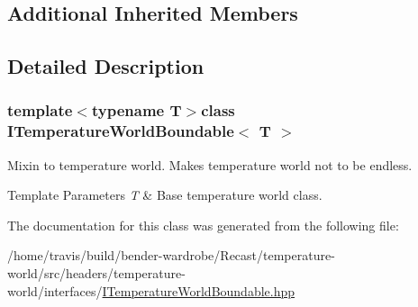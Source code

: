\subsection*{Additional Inherited Members}


\subsection{Detailed Description}
\subsubsection*{template$<$typename T$>$class I\-Temperature\-World\-Boundable$<$ T $>$}

Mixin to temperature world. Makes temperature world not to be endless.


\begin{DoxyTemplParams}{Template Parameters}
{\em T} & Base temperature world class. \\
\hline
\end{DoxyTemplParams}


The documentation for this class was generated from the following file\-:\begin{DoxyCompactItemize}
\item 
/home/travis/build/bender-\/wardrobe/\-Recast/temperature-\/world/src/headers/temperature-\/world/interfaces/\hyperlink{_i_temperature_world_boundable_8hpp}{I\-Temperature\-World\-Boundable.\-hpp}\end{DoxyCompactItemize}
